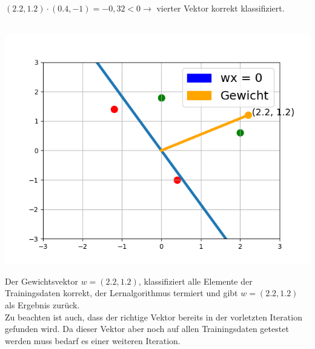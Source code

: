 \documentclass[a4paper]{scrartcl}
\newenvironment{Figure}
  {\par\medskip\noindent\minipage{\linewidth}}
  {\endminipage\par\medskip}
\begin{document}
\begin{multicols}{2}
                        $(2.2,1.2)\cdot (0.4,-1) = -0,32 < 0 \rightarrow$ vierter Vektor korrekt klassifiziert.\\
                        \\
                        \begin{Figure}
                            \centering
                            \includegraphics[width=\linewidth]{bsp4.png}
                        \end{Figure}
                        Der Gewichtsvektor $w = (2.2,1.2)$, klassifiziert alle Elemente der Trainingsdaten korrekt, der Lernalgorithmus termiert und gibt $w = (2.2,1.2)$ als Ergebnis zurück.\\
                        Zu beachten ist auch, dass der richtige Vektor bereits in der vorletzten Iteration gefunden wird. Da dieser Vektor aber noch auf allen Trainingsdaten getestet werden muss bedarf es einer weiteren Iteration.


\end{multicols}
\end{document}
